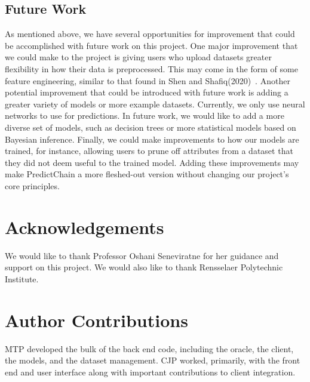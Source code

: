 \documentclass{ledger}
\begin{document}
\subsection{Future Work}

As mentioned above, we have several opportunities for improvement that could be accomplished with future work
on this project.  One major improvement that we could make to the project is giving users who upload datasets greater
flexibility in how their data is preprocessed.  This may come in the form of some feature engineering, similar to
that found in Shen and Shafiq(2020)~\cite{deepPrediction}.  Another potential improvement that could be introduced with
future work is adding a greater variety of models or more example datasets.  Currently, we only use neural networks to
use for predictions.  In future work, we would like to add a more diverse set of models, such as decision trees or
more statistical models based on Bayesian inference.  Finally, we could make improvements to how our models are
trained, for instance, allowing users to prune off attributes from a dataset that they did not deem useful to the
trained model.  Adding these improvements may make PredictChain a more fleshed-out version without changing our project's
core principles.

\ledgernotes

\section*{Acknowledgements} 

We would like to thank Professor Oshani Seneviratne for her guidance and support on this project.
We would also like to thank Rensselaer Polytechnic Institute.

\section*{Author Contributions}

MTP developed the bulk of the back end code, including the oracle, the client, the models, and the dataset management.
CJP worked, primarily, with the front end and user interface along with important contributions to client integration.



\end{document}
